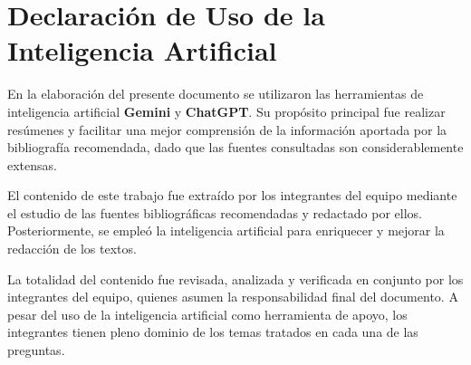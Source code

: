 \documentclass[11pt,a4paper]{article}
\begin{document}
\newpage
\section*{Declaración de Uso de la Inteligencia Artificial}

En la elaboración del presente documento se utilizaron las herramientas de inteligencia artificial \textbf{Gemini} y \textbf{ChatGPT}. Su propósito principal fue realizar resúmenes y facilitar una mejor comprensión de la información aportada por la bibliografía recomendada, dado que las fuentes consultadas son considerablemente extensas.

El contenido de este trabajo fue extraído por los integrantes del equipo mediante el estudio de las fuentes bibliográficas recomendadas y redactado por ellos. Posteriormente, se empleó la inteligencia artificial para enriquecer y mejorar la redacción de los textos.

La totalidad del contenido fue revisada, analizada y verificada en conjunto por los integrantes del equipo, quienes asumen la responsabilidad final del documento. A pesar del uso de la inteligencia artificial como herramienta de apoyo, los integrantes tienen pleno dominio de los temas tratados en cada una de las preguntas.
\end{document}
